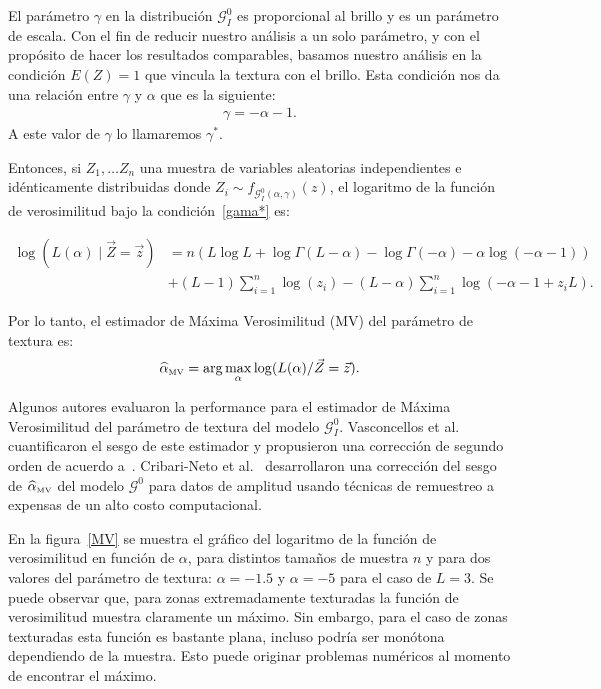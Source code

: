 El parámetro $\gamma$ en la distribución $\mathcal{G}_I^0$  es proporcional al brillo y es un parámetro de escala. Con el fin de reducir nuestro análisis a un solo parámetro, y con el propósito de hacer los resultados comparables, basamos nuestro análisis en la condición $E(Z)=1$ que vincula la textura con el brillo. Esta condición nos da una relación entre $\gamma$ y $\alpha$ que es la siguiente:
\begin{align}
\label{gama*}
\gamma=-\alpha-1. 
\end{align}
A este valor de $\gamma$ lo llamaremos $\gamma^*$.

Entonces, si $Z_1,\ldots Z_n$ una muestra de variables aleatorias independientes e idénticamente distribuidas donde $Z_i \sim f_{\mathcal G_I^0(\alpha,\gamma)}(z)$,  el logaritmo de la función de verosimilitud bajo la condición~\eqref{gama*} es:


\begin{align}
\nonumber \log (L(\alpha) \mid \vec{Z}=\vec{z})&=n(L \log L+\log \Gamma(L-\alpha)-\log \Gamma(-\alpha) -\alpha \log(-\alpha-1))\\
& + (L-1) \sum_{i=1}^n \log(z_i)-(L-\alpha) \sum_{i=1}^n\log(-\alpha-1+z_i L).
\end{align}


Por lo tanto, el estimador de Máxima Verosimilitud (MV) del parámetro de textura es:
\begin{align}
\widehat{\alpha}_{{\text{\tiny{MV}}}}=\arg\max_{\alpha} \log(L(\alpha)/\vec{Z}=\vec{z}).
\end{align}

Algunos autores evaluaron la performance para el estimador de Máxima Verosimilitud del parámetro de textura del modelo  $\mathcal G_I^0$. Vasconcellos et al.~\cite{VasconcellosFrerySilva:CompStat} cuantificaron el sesgo de este estimador y propusieron una corrección de segundo orden de acuerdo a~\cite{cox1968}. Cribari-Neto et al.~\cite{CribariFrerySilva:CSDA} desarrollaron una corrección del sesgo de $\widehat{\alpha}_{\text{{\text{\tiny{MV}}}}}$ del modelo $\mathcal G^0$ para datos de amplitud usando técnicas de remuestreo a expensas de un alto costo computacional.

En la figura~\ref{MV} se muestra el gráfico del logaritmo de la función de verosimilitud en función de $\alpha$, para distintos tamaños de muestra $n$ y para dos valores del parámetro de textura: $\alpha=-1.5$ y $\alpha=-5$ para el caso de $L=3$. Se puede observar que, para zonas extremadamente texturadas la función de verosimilitud muestra claramente un máximo. Sin embargo, para el caso de zonas texturadas esta función es bastante plana, incluso podría ser monótona dependiendo de la muestra. Esto puede originar problemas numéricos al momento de encontrar el máximo.  

